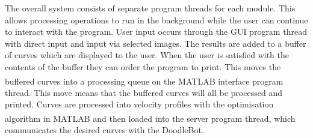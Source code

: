 The overall system consists of separate program threads for each module. This allows processing operations to run in the background while the user can continue to interact with the program. User input occurs through the GUI program thread with direct input and input via selected images. The results are added to a buffer of curves which are displayed to the user. When the user is satisfied with the contents of the buffer they can order the program to print. This moves the buffered curves into a processing queue on the MATLAB\textsuperscript{\textregistered} interface program thread. This move means that the buffered curves will all be processed and printed. Curves are processed into velocity profiles with the optimisation algorithm in MATLAB\textsuperscript{\textregistered} and then loaded into the server program thread, which communicates the desired curves with the DoodleBot.